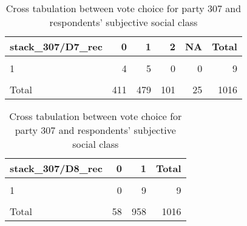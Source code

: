 \documentclass[
]{article}
\begin{document}
\begin{table}

\caption{\label{tab:unnamed-chunk-21}Cross tabulation between vote choice for party 307 and respondents' subjective social class
                   \label{table:crosstab_4_bg}}
\centering
\begin{tabular}[t]{l|r|r|r|r|r}
\hline
stack\_307/D7\_rec & 0 & 1 & 2 & NA & Total\\
\hline
\cellcolor{gray!6}{0} & \cellcolor{gray!6}{390} & \cellcolor{gray!6}{448} & \cellcolor{gray!6}{94} & \cellcolor{gray!6}{21} & \cellcolor{gray!6}{953}\\
\hline
1 & 4 & 5 & 0 & 0 & 9\\
\hline
\cellcolor{gray!6}{NA} & \cellcolor{gray!6}{17} & \cellcolor{gray!6}{26} & \cellcolor{gray!6}{7} & \cellcolor{gray!6}{4} & \cellcolor{gray!6}{54}\\
\hline
Total & 411 & 479 & 101 & 25 & 1016\\
\hline
\end{tabular}
\end{table}

\begin{table}

\caption{\label{tab:unnamed-chunk-21}Cross tabulation between vote choice for party 307 and respondents' subjective social class
                   \label{table:crosstab_4_bg}}
\centering
\begin{tabular}[t]{l|r|r|r}
\hline
stack\_307/D8\_rec & 0 & 1 & Total\\
\hline
\cellcolor{gray!6}{0} & \cellcolor{gray!6}{55} & \cellcolor{gray!6}{898} & \cellcolor{gray!6}{953}\\
\hline
1 & 0 & 9 & 9\\
\hline
\cellcolor{gray!6}{NA} & \cellcolor{gray!6}{3} & \cellcolor{gray!6}{51} & \cellcolor{gray!6}{54}\\
\hline
Total & 58 & 958 & 1016\\
\hline
\end{tabular}
\end{table}
\end{document}
